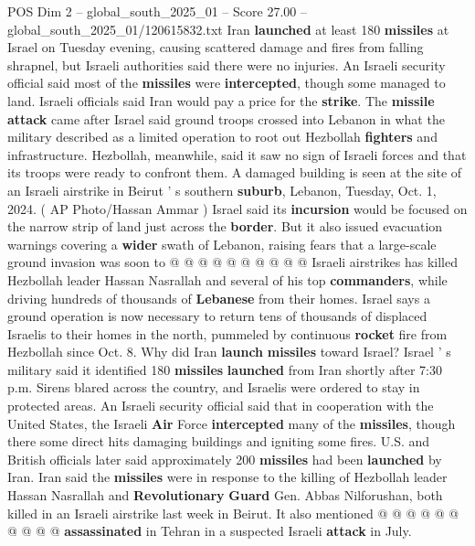 \begin{textsample}{POS Dim 2 – global\_south\_2025\_01 – Score 27.00 – global\_south\_2025\_01/120615832.txt}  \label{ex:f2_pos_322}
Iran \textbf{launched} at least 180 \textbf{missiles} at Israel on Tuesday evening, causing scattered damage and fires from falling shrapnel, but Israeli authorities said there were no injuries.
An Israeli security official said most of the \textbf{missiles} were \textbf{intercepted}, though some managed to land.
Israeli officials said Iran would pay a price for the \textbf{strike}.
The \textbf{missile} \textbf{attack} came after Israel said ground troops crossed into Lebanon in what the military described as a limited operation to root out Hezbollah \textbf{fighters} and infrastructure.
Hezbollah, meanwhile, said it saw no sign of Israeli forces and that its troops were ready to confront them.
A damaged building is seen at the site of an Israeli airstrike in Beirut ' s southern \textbf{suburb}, Lebanon, Tuesday, Oct. 1, 2024. ( AP Photo/Hassan Ammar ) Israel said its \textbf{incursion} would be focused on the narrow strip of land just across the \textbf{border}.
But it also issued evacuation warnings covering a \textbf{wider} swath of Lebanon, raising fears that a large-scale ground invasion was soon to @ @ @ @ @ @ @ @ @ @ Israeli airstrikes has killed Hezbollah leader Hassan Nasrallah and several of his top \textbf{commanders}, while driving hundreds of thousands of \textbf{Lebanese} from their homes.
Israel says a ground operation is now necessary to return tens of thousands of displaced Israelis to their homes in the north, pummeled by continuous \textbf{rocket} fire from Hezbollah since Oct. 8.
Why did Iran \textbf{launch} \textbf{missiles} toward Israel?
Israel ' s military said it identified 180 \textbf{missiles} \textbf{launched} from Iran shortly after 7:30 p.m.
Sirens blared across the country, and Israelis were ordered to stay in protected areas.
An Israeli security official said that in cooperation with the United States, the Israeli \textbf{Air} Force \textbf{intercepted} many of the \textbf{missiles}, though there some direct hits damaging buildings and igniting some fires.
U.S. and British officials later said approximately 200 \textbf{missiles} had been \textbf{launched} by Iran.
Iran said the \textbf{missiles} were in response to the killing of Hezbollah leader Hassan Nasrallah and \textbf{Revolutionary} \textbf{Guard} Gen.
Abbas Nilforushan, both killed in an Israeli airstrike last week in Beirut.
It also mentioned @ @ @ @ @ @ @ @ @ @ \textbf{assassinated} in Tehran in a suspected Israeli \textbf{attack} in July.

\end{textsample}
